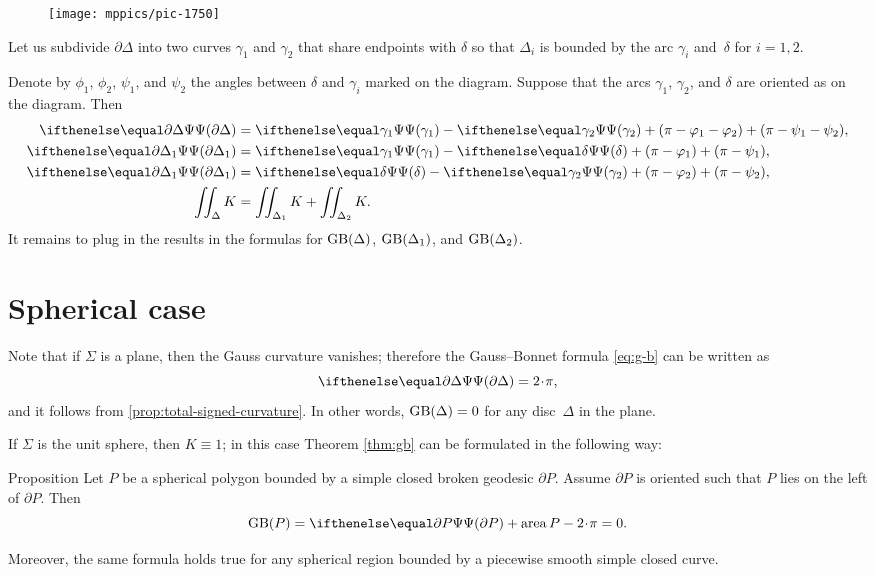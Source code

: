 \begin{wrapfigure}[8]{r}{40 mm}
\vskip-4mm
\centering
\texttt{[image: mppics/pic-1750]}
\end{wrapfigure}

Let us subdivide $\partial \Delta$ into two curves $\gamma_1$ and $\gamma_2$ that share  endpoints with $\delta$ so that
 $\Delta_i$ is bounded by the arc $\gamma_i$  and~$\delta$ for $i=1,2.$

Denote by $\phi_1$, $\phi_2$, $\psi_1$, and $\psi_2$ the angles between $\delta$ and $\gamma_i$ marked on the diagram.
Suppose that the arcs $\gamma_1$, $\gamma_2$, and $\delta$ are oriented as on the diagram. 
Then
\begin{align*}
\tgc{\partial \Delta}&= \tgc{\gamma_1}-\tgc{\gamma_2}+(\pi-\phi_1-\phi_2)+(\pi-\psi_1-\psi_2),
\\
\tgc{\partial \Delta_1}&= \tgc{\gamma_1}-\tgc\delta+(\pi-\phi_1)+(\pi-\psi_1),
\\
\tgc{\partial \Delta_1}&= \tgc\delta-\tgc{\gamma_2}+(\pi-\phi_2)+(\pi-\psi_2),
\\
\iint_\Delta K&=\iint_{\Delta_1} K+\iint_{\Delta_2} K.
\end{align*}
It remains to plug in the results in the formulas for $\mathop{\rm GB}\nolimits(\Delta)$, $\mathop{\rm GB}\nolimits(\Delta_1)$, and $\mathop{\rm GB}\nolimits(\Delta_2)$.
\qeds

\section{Spherical case}

Note that if $\Sigma$ is a plane, then the Gauss curvature vanishes;
therefore the Gauss--Bonnet formula \ref{eq:g-b} can be written as 
\[\tgc{\partial\Delta}=2\cdot \pi,\]
and it follows from \ref{prop:total-signed-curvature}.
In other words, $\mathop{\rm GB}\nolimits(\Delta)=0$ for any disc~$\Delta$ in the plane.

If $\Sigma$ is the unit sphere, then $K\equiv1$;
in this case Theorem \ref{thm:gb} can be formulated in the following way:

\begin{thm}{Proposition}\label{prop:area-of-spher-polygon}
Let $P$ be a spherical polygon bounded by a simple closed broken geodesic $\partial P$.
Assume $\partial P$ is oriented such that $P$ lies on the left of $\partial P$.
Then 
\[\GB(P)=\tgc{\partial P}+\area P-2\cdot \pi=0.\]

Moreover, the same formula holds true for any spherical region bounded by a piecewise smooth simple closed curve.
\end{thm}

